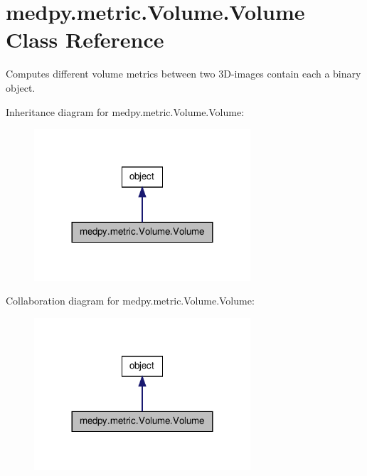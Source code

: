 \hypertarget{classmedpy_1_1metric_1_1Volume_1_1Volume}{
\section{medpy.metric.Volume.Volume Class Reference}
\label{classmedpy_1_1metric_1_1Volume_1_1Volume}
}


Computes different volume metrics between two 3D-\/images contain each a binary object.  




Inheritance diagram for medpy.metric.Volume.Volume:\nopagebreak
\begin{figure}[H]
\begin{center}
\leavevmode
\includegraphics[width=228pt]{classmedpy_1_1metric_1_1Volume_1_1Volume__inherit__graph}
\end{center}
\end{figure}


Collaboration diagram for medpy.metric.Volume.Volume:\nopagebreak
\begin{figure}[H]
\begin{center}
\leavevmode
\includegraphics[width=228pt]{classmedpy_1_1metric_1_1Volume_1_1Volume__coll__graph}
\end{center}
\end{figure}
